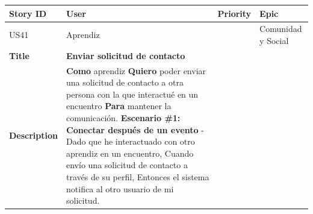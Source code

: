 {\def\LTcaptype{none} %
\begin{longtable}[]{@{}
  >{\raggedright\arraybackslash}p{}
  >{\raggedright\arraybackslash}p{}
  >{\raggedright\arraybackslash}p{}
  >{\raggedright\arraybackslash}p{}@{}}
\toprule\noalign{}
\begin{minipage}[b]{\linewidth}\raggedright
Story ID
\end{minipage} & \begin{minipage}[b]{\linewidth}\raggedright
User
\end{minipage} & \begin{minipage}[b]{\linewidth}\raggedright
Priority
\end{minipage} & \begin{minipage}[b]{\linewidth}\raggedright
Epic
\end{minipage} \\
\midrule\noalign{}
\endhead
\bottomrule\noalign{}
\endlastfoot
US41 & Aprendiz & 3 & Comunidad y Social \\
\textbf{Title} & \textbf{Enviar solicitud de contacto} & & \\
\textbf{Description} & \textbf{Como} aprendiz \textbf{Quiero} poder
enviar una solicitud de contacto a otra persona con la que interactué en
un encuentro \textbf{Para} mantener la comunicación. \textbf{Escenario
\#1: Conectar después de un evento} - Dado que he interactuado con otro
aprendiz en un encuentro, Cuando envío una solicitud de contacto a
través de su perfil, Entonces el sistema notifica al otro usuario de mi
solicitud. & & \\
\end{longtable}
}

